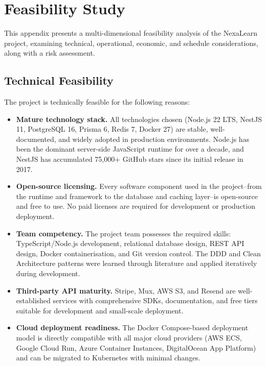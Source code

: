 
\chapter{Feasibility Study}
\label{app:feasibility}

This appendix presents a multi-dimensional feasibility analysis of the NexaLearn project, examining technical, operational, economic, and schedule considerations, along with a risk assessment.

\section{Technical Feasibility}
\label{sec:app-tech-feasibility}

The project is technically feasible for the following reasons:

\begin{itemize}
  \item \textbf{Mature technology stack.} All technologies chosen (Node.js 22 LTS, NestJS 11, PostgreSQL 16, Prisma 6, Redis 7, Docker 27) are stable, well-documented, and widely adopted in production environments. Node.js has been the dominant server-side JavaScript runtime for over a decade, and NestJS has accumulated 75,000+ GitHub stars since its initial release in 2017.
  \item \textbf{Open-source licensing.} Every software component used in the project--from the runtime and framework to the database and caching layer--is open-source and free to use. No paid licenses are required for development or production deployment.
  \item \textbf{Team competency.} The project team possesses the required skills: TypeScript/Node.js development, relational database design, REST API design, Docker containerisation, and Git version control. The DDD and Clean Architecture patterns were learned through literature and applied iteratively during development.
  \item \textbf{Third-party API maturity.} Stripe, Mux, AWS S3, and Resend are well-established services with comprehensive SDKs, documentation, and free tiers suitable for development and small-scale deployment.
  \item \textbf{Cloud deployment readiness.} The Docker Compose-based deployment model is directly compatible with all major cloud providers (AWS ECS, Google Cloud Run, Azure Container Instances, DigitalOcean App Platform) and can be migrated to Kubernetes with minimal changes.
\end{itemize}

